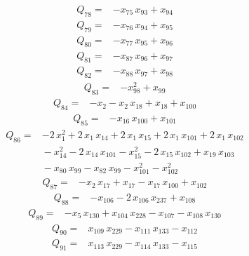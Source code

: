 \documentclass[11pt]{article}
\theoremstyle{definition}\newtheorem{definition}[theorem]{Definition}
\begin{document}
\begin{align*}
Q_{78}={}&-x_{75}\,x_{93}+x_{94}
\end{align*}
\begin{align*}
Q_{79}={}&-x_{76}\,x_{94}+x_{95}
\end{align*}
\begin{align*}
Q_{80}={}&-x_{77}\,x_{95}+x_{96}
\end{align*}
\begin{align*}
Q_{81}={}&-x_{87}\,x_{96}+x_{97}
\end{align*}
\begin{align*}
Q_{82}={}&-x_{88}\,x_{97}+x_{98}
\end{align*}
\begin{align*}
Q_{83}={}&-x_{98}^{2}+x_{99}
\end{align*}
\begin{align*}
Q_{84}={}&-x_{2}-x_{2}\,x_{18}+x_{18}+x_{100}
\end{align*}
\begin{align*}
Q_{85}={}&-x_{16}\,x_{100}+x_{101}
\end{align*}
\begin{align*}
Q_{86}={}&-2\,x_{1}^{2}+2\,x_{1}\,x_{14}+2\,x_{1}\,x_{15}+2\,x_{1}\,x_{101}+2\,x_{1}\,x_{102}
\\ &{}-x_{14}^{2}-2\,x_{14}\,x_{101}-x_{15}^{2}-2\,x_{15}\,x_{102}+x_{19}\,x_{103}
\\ &{}-x_{80}\,x_{99}-x_{82}\,x_{99}-x_{101}^{2}-x_{102}^{2}
\end{align*}
\begin{align*}
Q_{87}={}&-x_{2}\,x_{17}+x_{17}-x_{17}\,x_{100}+x_{102}
\end{align*}
\begin{align*}
Q_{88}={}&-x_{106}-2\,x_{106}\,x_{237}+x_{108}
\end{align*}
\begin{align*}
Q_{89}={}&-x_{5}\,x_{130}+x_{104}\,x_{228}-x_{107}-x_{108}\,x_{130}
\end{align*}
\begin{align*}
Q_{90}={}&x_{109}\,x_{229}-x_{111}\,x_{133}-x_{112}
\end{align*}
\begin{align*}
Q_{91}={}&x_{113}\,x_{229}-x_{114}\,x_{133}-x_{115}
\end{align*}
\end{document}

